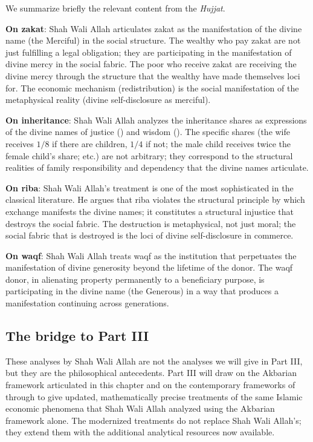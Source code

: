 We summarize briefly the relevant content from the \textit{Hujjat}.

\textbf{On zakat}: Shah Wali Allah articulates zakat as the
manifestation of the divine name  (the Merciful) in
the social structure. The wealthy who pay zakat are not just
fulfilling a legal obligation; they are participating in the
manifestation of divine mercy in the social fabric. The poor who
receive zakat are receiving the divine mercy through the structure
that the wealthy have made themselves loci for. The economic
mechanism (redistribution) is the social manifestation of the
metaphysical reality (divine self-disclosure as merciful).

\textbf{On inheritance}: Shah Wali Allah analyzes the inheritance
shares as expressions of the divine names of justice ()
and wisdom (). The specific shares (the wife receives
$1/8$ if there are children, $1/4$ if not; the male child receives
twice the female child's share; etc.) are not arbitrary; they
correspond to the structural realities of family responsibility
and dependency that the divine names articulate.

\textbf{On riba}: Shah Wali Allah's treatment is one of the most
sophisticated in the classical literature. He argues that riba
violates the structural principle by which exchange manifests the
divine names; it constitutes a structural injustice that destroys
the social fabric. The destruction is metaphysical, not just moral;
the social fabric that is destroyed is the loci of divine
self-disclosure in commerce.

\textbf{On waqf}: Shah Wali Allah treats waqf as the institution
that perpetuates the manifestation of divine generosity beyond the
lifetime of the donor. The waqf donor, in alienating property
permanently to a beneficiary purpose, is participating in the
divine name  (the Generous) in a way that produces a
manifestation continuing across generations.

\subsection{The bridge to Part III}

These analyses by Shah Wali Allah are not the analyses we will give
in Part III, but they are the philosophical antecedents. Part III
will draw on the Akbarian framework articulated in this chapter and
on the contemporary frameworks of 
through  to give updated, mathematically
precise treatments of the same Islamic economic phenomena that Shah
Wali Allah analyzed using the Akbarian framework alone. The
modernized treatments do not replace Shah Wali Allah's; they extend
them with the additional analytical resources now available.

